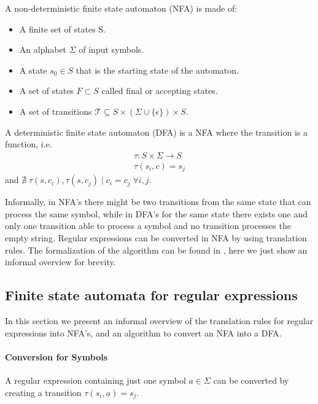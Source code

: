 \begin{definition}
	A non-deterministic finite state automaton (NFA) is made of:
	
	\begin{itemize}[noitemsep]
		\item A finite set of states S.
		\item An alphabet $\Sigma$ of input symbols.
		\item A state $s_{0} \in S$ that is the starting state of the automaton.
		\item A set of states $F \subset S$ called final or accepting states.
		\item A set of transitions $\mathcal{T} \subseteq S \times (\Sigma \cup \lbrace \epsilon \rbrace) \times S$.
	\end{itemize}
\end{definition}

\begin{definition}
	A deterministic finite state automaton (DFA) is a NFA where the transition is a function, i.e.
	\begin{equation*}
		\begin{array}{l}
			\tau : S \times \Sigma \rightarrow S\\
			\tau(s_{i},c) = s_{j}
		\end{array}
	\end{equation*}
	and $\nexists \; \tau(s,c_{i}),\tau(s,c_{j}) \; | \; c_{i} = c_{j} \; \forall i,j$.
\end{definition}

Informally, in NFA's there might be two transitions from the same state that can process the same symbol, while in DFA's for the same state there exists one and only one transition able to process a symbol and no transition processes the empty string. Regular expressions can be converted in NFA by using translation rules. The formalization of the algorithm can be found in \cite{mcnaughton1960regular}, here we just show an informal overview for brevity.

\subsection{Finite state automata for regular expressions}
\label{subsec:ch_background_automata}
In this section we present an informal overview of the translation rules for regular expressions into NFA's, and an algorithm to convert an NFA into a DFA.

\paragraph{Conversion for Symbols}
A regular expression containing just one symbol $a \in \Sigma$ can be converted by creating a transition $\tau(s_{i},a) = s_{j}$.

